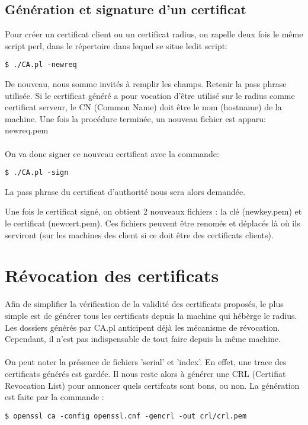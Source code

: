 \subsection{Génération et signature d'un certificat}
Pour créer un certificat client ou un certificat radius, on rapelle deux fois le même script perl, dans le répertoire dans lequel se situe ledit script: 

\begin{verbatim}
$ ./CA.pl -newreq
\end{verbatim}
De nouveau, nous somme invités à remplir les champs. Retenir la pass phrase utilisée. 
Si le certificat généré a pour vocation d'être utilisé sur le radius comme certificat serveur, le CN (Common Name) doit être le nom (hostname) de la machine.
Une fois la procédure terminée, un nouveau fichier est apparu: newreq.pem\\\\
On va donc signer ce nouveau certificat avec la commande: 
\begin{verbatim}
$ ./CA.pl -sign
\end{verbatim}
La pass phrase du certificat d'authorité nous sera alors demandée.

Une fois le certificat signé, on obtient 2 nouveaux fichiers : la clé (newkey.pem) et le certificat (newcert.pem). Ces fichiers peuvent être renomés et déplacés là où ils serviront (sur les machines des client si ce doit être des certificats clients). 


\section{Révocation des certificats}

Afin de simplifier la vérification de la validité des certificats proposés, le plus simple est de générer tous les certificats depuis la machine qui hébèrge le radius. Les dossiers générés par CA.pl anticipent déjà les mécanisme de révocation. Cependant, il n'est pas indispensable de tout faire depuis la même machine.\\\\
On peut noter la présence de fichiers 'serial' et 'index'. En effet, une trace des certificats générés est gardée. Il nous reste alors à générer une CRL (Certifiat Revocation List) pour annoncer quels certifcats sont bons, ou non. 
La génération est faite par la commande : 
\begin{verbatim}
$ openssl ca -config openssl.cnf -gencrl -out crl/crl.pem
\end{verbatim}

